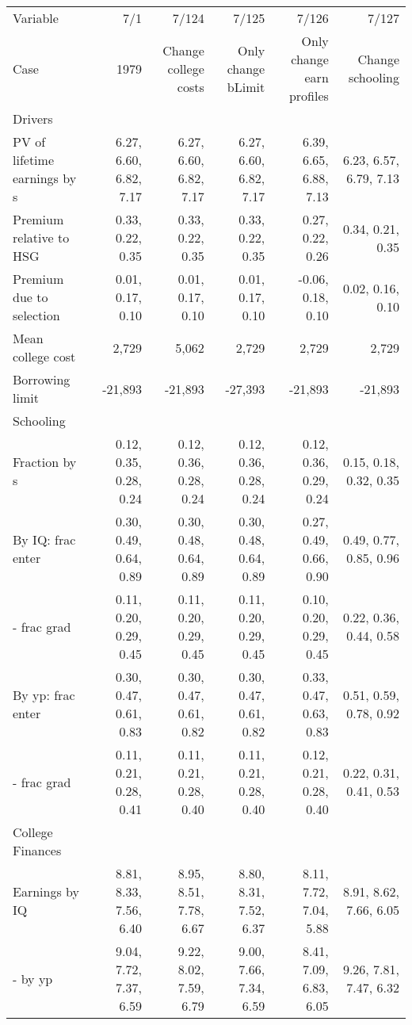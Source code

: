 \begin{tabular}{lrrrrr}
\hline
Variable & 7/1  & 7/124  & 7/125  & 7/126  & 7/127  \\ 
Case & 1979  & Change college costs  & Only change bLimit  & Only change earn profiles  & Change schooling  \\ 
Drivers &   &   &   &   &   \\ 
PV of lifetime earnings by s & 6.27, 6.60, 6.82, 7.17  & 6.27, 6.60, 6.82, 7.17  & 6.27, 6.60, 6.82, 7.17  & 6.39, 6.65, 6.88, 7.13  & 6.23, 6.57, 6.79, 7.13  \\ 
Premium relative to HSG & 0.33, 0.22, 0.35  & 0.33, 0.22, 0.35  & 0.33, 0.22, 0.35  & 0.27, 0.22, 0.26  & 0.34, 0.21, 0.35  \\ 
Premium due to selection & 0.01, 0.17, 0.10  & 0.01, 0.17, 0.10  & 0.01, 0.17, 0.10  & -0.06, 0.18, 0.10  & 0.02, 0.16, 0.10  \\ 
Mean college cost & 2,729  & 5,062  & 2,729  & 2,729  & 2,729  \\ 
Borrowing limit & -21,893  & -21,893  & -27,393  & -21,893  & -21,893  \\ 
\hline
Schooling &   &   &   &   &   \\ 
Fraction by s & 0.12, 0.35, 0.28, 0.24  & 0.12, 0.36, 0.28, 0.24  & 0.12, 0.36, 0.28, 0.24  & 0.12, 0.36, 0.29, 0.24  & 0.15, 0.18, 0.32, 0.35  \\ 
By IQ: frac enter & 0.30, 0.49, 0.64, 0.89  & 0.30, 0.48, 0.64, 0.89  & 0.30, 0.48, 0.64, 0.89  & 0.27, 0.49, 0.66, 0.90  & 0.49, 0.77, 0.85, 0.96  \\ 
- frac grad & 0.11, 0.20, 0.29, 0.45  & 0.11, 0.20, 0.29, 0.45  & 0.11, 0.20, 0.29, 0.45  & 0.10, 0.20, 0.29, 0.45  & 0.22, 0.36, 0.44, 0.58  \\ 
By yp: frac enter & 0.30, 0.47, 0.61, 0.83  & 0.30, 0.47, 0.61, 0.82  & 0.30, 0.47, 0.61, 0.82  & 0.33, 0.47, 0.63, 0.83  & 0.51, 0.59, 0.78, 0.92  \\ 
- frac grad & 0.11, 0.21, 0.28, 0.41  & 0.11, 0.21, 0.28, 0.40  & 0.11, 0.21, 0.28, 0.40  & 0.12, 0.21, 0.28, 0.40  & 0.22, 0.31, 0.41, 0.53  \\ 
\hline
College Finances &   &   &   &   &   \\ 
Earnings by IQ & 8.81, 8.33, 7.56, 6.40  & 8.95, 8.51, 7.78, 6.67  & 8.80, 8.31, 7.52, 6.37  & 8.11, 7.72, 7.04, 5.88  & 8.91, 8.62, 7.66, 6.05  \\ 
- by yp & 9.04, 7.72, 7.37, 6.59  & 9.22, 8.02, 7.59, 6.79  & 9.00, 7.66, 7.34, 6.59  & 8.41, 7.09, 6.83, 6.05  & 9.26, 7.81, 7.47, 6.32  \\ 

\end{tabular}
